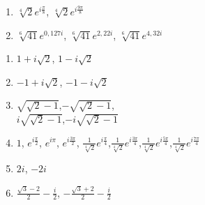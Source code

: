 \documentclass[a4paper,norsk,12pt]{article}
\begin{document}
\begin{appendix}
\begin{multicols}{3}
\begin{enumerate}[label=10\alph*)]
\item $\sqrt[4]{2}e^{i\frac{\pi}{8}}$, $\sqrt[4]{2}e^{i\frac{9\pi}{8}}$
\item $\sqrt[6]{41}e^{0,127i}$, $\sqrt[6]{41}e^{2,22i}$, $\sqrt[6]{41}e^{4,32i}$
\end{enumerate}
\vspace{6pt}
\begin{enumerate}[label=11\alph*)]
\item $1+i\sqrt{2}$, $1-i\sqrt{2}$
\item $-1+i\sqrt{2}$, $-1-i\sqrt{2}$
\item $\sqrt{\sqrt{2}-1}$,$-\sqrt{\sqrt{2}-1}$,\\ $i\sqrt{\sqrt{2}-1}$,$-i\sqrt{\sqrt{2}-1}$
\item $1$, $e^{i\frac{\pi}{2}}$, $e^{i\pi}$, $e^{i\frac{3\pi}{2}}$, 
	$\frac{1}{\sqrt[4]{2}}e^{i\frac{\pi}{4}}$,$\frac{1}{\sqrt[4]{2}}e^{i\frac{3\pi}{4}}$,$\frac{1}{\sqrt[4]{2}}e^{i\frac{5\pi}{4}}$,$\frac{1}{\sqrt[4]{2}}e^{i\frac{7\pi}{4}}$
\item $2i$, $-2i$
\item $\frac{\sqrt{3}-2}{2}-\frac{i}{2}$, $-\frac{\sqrt{3}+2}{2}-\frac{i}{2}$
\end{enumerate}
\end{multicols}
\end{appendix}
\end{document}
